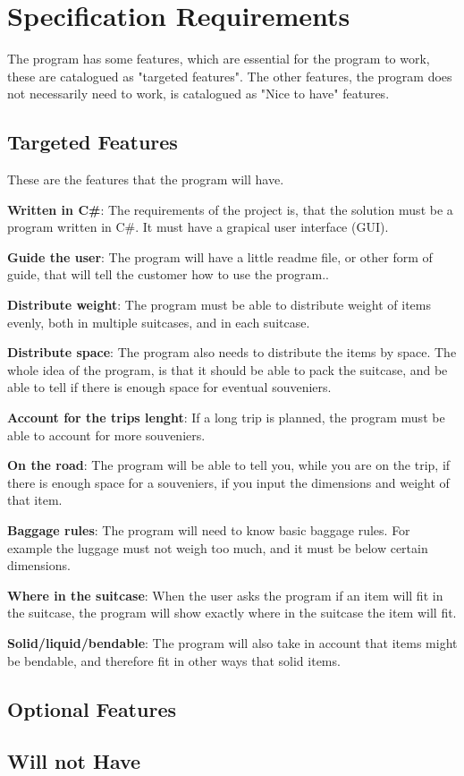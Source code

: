 \section{Specification Requirements}
\label{sec:Spec}
The program has some features, which are essential for the program to work, these are catalogued as "targeted features". The other features, the program does not necessarily need to work, is catalogued as "Nice to have" features.
\newline

\subsection{Targeted Features}
These are the features that the program will have. 


\textbf{Written in C\#}:
The requirements of the project is, that the solution must be a program written in C\#. It must have a grapical user interface (GUI).

\textbf{Guide the user}:
The program will have a little readme file, or other form of guide, that will tell the customer how to use the program..
\newline

\textbf{Distribute weight}:
The program must be able to distribute weight of items evenly, both in multiple suitcases, and in each suitcase.
\newline

\textbf{Distribute space}:
The program also needs to distribute the items by space. The whole idea of the program, is that it should be able to pack the suitcase, and be able to tell if there is enough space for eventual souveniers.
\newline

\textbf{Account for the trips lenght}:
If a long trip is planned, the program must be able to account for more souveniers.
\newline

\textbf{On the road}:
The program will be able to tell you, while you are on the trip, if there is enough space for a souveniers, if you input the dimensions and weight of that item. 
\newline

\textbf{Baggage rules}:
The program will need to know basic baggage rules. For example the luggage must not weigh too much, and it must be below certain dimensions. 
\newline

\textbf{Where in the suitcase}:
When the user asks the program if an item will fit in the suitcase, the program will show exactly where in the suitcase the item will fit.
\newline

\textbf{Solid/liquid/bendable}:
The program will also take in account that items might be bendable, and therefore fit in other ways that solid items. 
\newline

\subsection{Optional Features}

\subsection{Will not Have}
